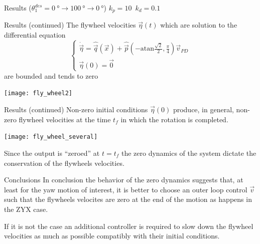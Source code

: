 \begin{frame}{Results ($\theta_1^{des} = \SI{0}{\degree}\rightarrow \SI{100}{\degree}\rightarrow \SI{0}{\degree}$)
    \quad $k_p = 10 \enspace k_d = 0.1$ \hfill \color{dgreen}{ZYX}}
\end{frame}

\begin{frame}{Results (continued) \hfill \color{dgreen}{ZYX}}
  The flywheel velocities $\vec{\eta}(t)$ which are
  solution to the differential equation
  \[
  \begin{cases}
    \dot{\vec{\eta}} = \hat{\vec{q}}(\vec{x}) + \hat{\vec{p}}\left(-\mathrm{atan}\frac{\sqrt{2}}{2},\frac{\pi}{4}\right)\vec{v}_{PD}\\
    \vec{\eta}(0) = \vec{0}
  \end{cases}
  \]
  are bounded and tends to zero
  \par
  \centering
  \texttt{[image: fly\_wheel2]}
\end{frame}

\begin{frame}{Results (continued) \hfill \color{dgreen}{ZYX}}
  Non-zero initial conditions $\vec{\eta}(0)$ produce, in general,
  non-zero flywheel velocities at the time $t_f$ in which the
  rotation is completed.
  \par
  \centering
  \texttt{[image: fly\_wheel\_several]}
  \par
  Since the output is ``zeroed'' at $t=t_f$ the zero dynamics of the system
  dictate the conservation of the flywheels velocities.
\end{frame}

\begin{frame}{Conclusions}
  In conclusion the behavior of the zero dynamics suggests that,
  at least for the yaw motion of interest, it is better to choose an outer loop control $\vec{v}$
  such that the flywheels velocites are zero at the end of the motion
  as happens in the \textcolor{dgreen}{ZYX} case.
  \par
  If it is not the case an additional controller is required to slow down the flywheel
  velocities as much as possible compatibly with their initial conditions.
\end{frame}

